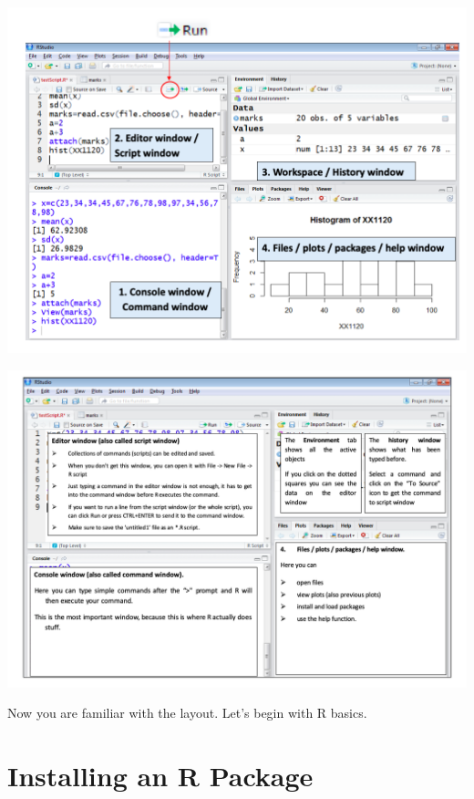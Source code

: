 \documentclass[
]{book}
\begin{document}
\begin{center}\includegraphics[width=1\linewidth]{figure/Rstudio1} \end{center}

\begin{center}\includegraphics[width=1\linewidth]{figure/Rstudio2} \end{center}

Now you are familiar with the layout. Let's begin with R basics.

\hypertarget{installing-an-r-package-1}{%
\section{Installing an R Package}\label{installing-an-r-package-1}}
\end{document}
